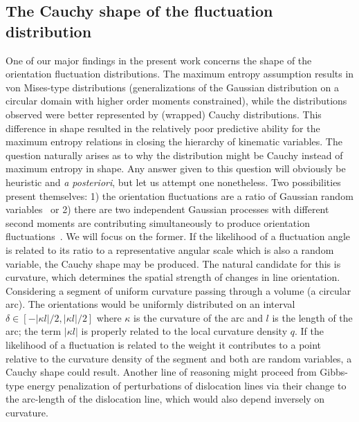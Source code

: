 \subsection{The Cauchy shape of the fluctuation distribution}
One of our major findings in the present work concerns the shape of the orientation fluctuation distributions. The maximum entropy assumption results in von Mises-type distributions (generalizations of the Gaussian distribution on a circular domain with higher order moments constrained), while the distributions observed were better represented by (wrapped) Cauchy distributions. This difference in shape resulted in the relatively poor predictive ability for the maximum entropy relations in closing the hierarchy of kinematic variables. The question naturally arises as to why the distribution might be Cauchy instead of maximum entropy in shape. Any answer given to this question will obviously be heuristic and \emph{a posteriori}, but let us attempt one nonetheless. Two possibilities present themselves: 1) the orientation fluctuations are a ratio of Gaussian random variables~\cite{mardiaStatisticsDirectionalData1975} or 2) there are two independent Gaussian processes with different second moments are contributing simultaneously to produce orientation fluctuations~\cite{baileyEmergenceWrappedCauchy2021}. We will focus on the former. If the likelihood of a fluctuation angle is related to its ratio to a representative angular scale which is also a random variable, the Cauchy shape may be produced. The natural candidate for this is curvature, which determines the spatial strength of changes in line orientation. Considering a segment of uniform curvature passing through a volume (a circular arc). The orientations would be uniformly distributed on an interval \(\delta \in \left\lbrack - |\kappa l|/2,|\kappa l|/2 \right\rbrack\) where \(\kappa\) is the curvature of the arc and \(l\) is the length of the arc; the term \(|\kappa l|\) is properly related to the local curvature density \(q\). If the likelihood of a fluctuation is related to the weight it contributes to a point relative to the curvature density of the segment and both are random variables, a Cauchy shape could result. Another line of reasoning might proceed from Gibbs-type energy penalization of perturbations of dislocation lines via their change to the arc-length of the dislocation line, which would also depend inversely on curvature.

